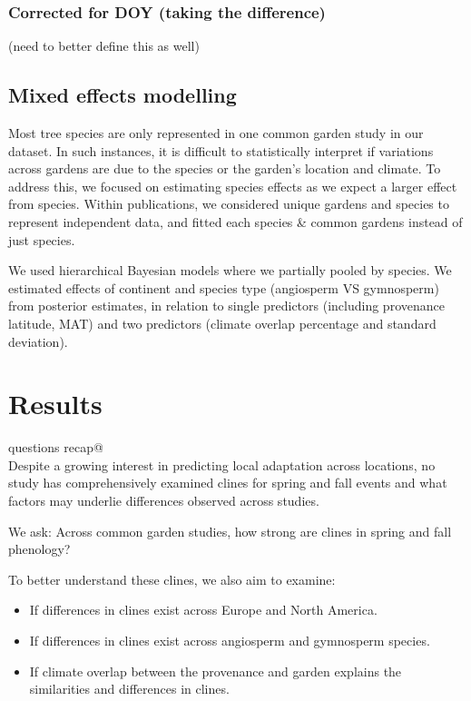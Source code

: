 \documentclass{article}
\begin{document}
\subsubsection{Corrected for DOY (taking the difference)}
(need to better define this as well)


\subsection{Mixed effects modelling}

Most tree species are only represented in one common garden study in our dataset. In such instances, it is difficult to statistically interpret if variations across gardens are due to the species or the garden’s location and climate. To address this, we focused on estimating species effects as we expect a larger effect from species. Within publications, we considered unique gardens and species to represent independent data, and fitted each species \& common gardens instead of just species.

We used hierarchical Bayesian models where we partially pooled by species. We estimated effects of continent and species type (angiosperm VS gymnosperm) from posterior estimates, in relation to single predictors (including provenance latitude, MAT) and two predictors (climate overlap percentage and standard deviation). 


\section{Results}

\verb@Research questions recap@
\\
Despite a growing interest in predicting local adaptation across locations, no study has comprehensively examined clines for spring and fall events and what factors may underlie differences observed across studies.

We ask: Across common garden studies, how strong are clines in spring and fall phenology?

To better understand these clines, we also aim to examine:
\begin{itemize}
\item If differences in clines exist across Europe and North America.
\item If differences in clines exist across angiosperm and gymnosperm species.
\item If climate overlap between the provenance and garden explains the similarities and differences in clines.
\end{itemize}
\end{document}
